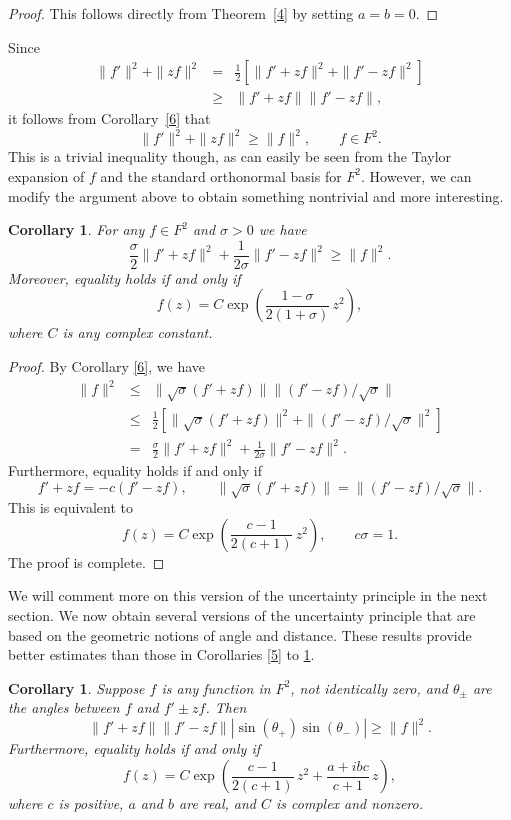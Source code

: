 \documentclass[12pt,reqno]{amsart}
\newtheorem{cor}[thm]{Corollary}
\begin{document}
\begin{proof}
This follows directly from Theorem~\ref{4} by setting $a=b=0$.
\end{proof}

Since
\begin{eqnarray*}
\|f'\|^2+\|zf\|^2&=&\frac12\left[\|f'+zf\|^2+\|f'-zf\|^2\right]\\
&\ge&\|f'+zf\|\|f'-zf\|,
\end{eqnarray*}
it follows from Corollary~\ref{6} that 
$$\|f'\|^2+\|zf\|^2\ge\|f\|^2,\qquad f\in F^2.$$
This is a trivial inequality though, as can easily be seen from the Taylor expansion of $f$ and the standard orthonormal 
basis for $F^2$. However, we can modify the argument above to obtain something nontrivial and more interesting.

\begin{cor}
For any $f\in F^2$ and $\sigma>0$ we have
$$\frac\sigma2\|f'+zf\|^2+\frac1{2\sigma}\|f'-zf\|^2\ge\|f\|^2.$$
Moreover, equality holds if and only if
$$f(z)=C\exp\left(\frac{1-\sigma}{2(1+\sigma)}\,z^2\right),$$
where $C$ is any complex constant.
\label{7}
\end{cor}

\begin{proof}
By Corollary \ref{6}, we have
\begin{eqnarray*}
\|f\|^2&\le&\|\sqrt\sigma(f'+zf)\|\|(f'-zf)/\sqrt\sigma\|\\
&\le&\frac12\left[\|\sqrt\sigma(f'+zf)\|^2+\|(f'-zf)/\sqrt\sigma\|^2\right]\\
&=&\frac\sigma2\|f'+zf\|^2+\frac1{2\sigma}\|f'-zf\|^2.
\end{eqnarray*}
Furthermore, equality holds if and only if
$$f'+zf=-c(f'-zf),\qquad \|\sqrt\sigma(f'+zf)\|=\|(f'-zf)/\sqrt\sigma\|.$$
This is equivalent to
$$f(z)=C\exp\left(\frac{c-1}{2(c+1)}\,z^2\right),\qquad c\sigma=1.$$
The proof is complete.
\end{proof}

We will comment more on this version of the uncertainty principle in the next section. We now obtain several
versions of the uncertainty principle that are based on the geometric notions of 
angle and distance. These results provide better estimates than those in Corollaries \ref{5} to \ref{7}.

\begin{cor}
Suppose $f$ is any function in $F^2$, not identically zero, and $\theta_{\pm}$ are the angles between $f$ and 
$f'\pm zf$. Then
$$\|f'+zf\|\|f'-zf\||\sin(\theta_+)\sin(\theta_-)|\ge\|f\|^2.$$
Furthermore, equality holds if and only if
$$f(z)=C\exp\left(\frac{c-1}{2(c+1)}\,z^2+\frac{a+ibc}{c+1}\,z\right),$$
where $c$ is positive, $a$ and $b$ are real, and $C$ is complex and nonzero.
\label{8}
\end{cor}
\end{document}
